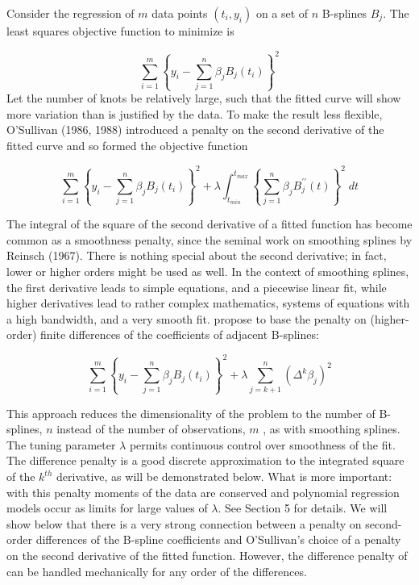 \documentclass[12pt]{article}
\newcommand*\needsparaphrased{\color{red}}
\begin{document}
Consider the regression of $m$ data points $\left(t_i,y_i\right)$ on a set of $n$ B-splines $B_j$. The least squares objective function to minimize is

\begin{equation} \label{eq:univariate_bspline_SSE}
\sum_{i=1}^m \left\{ y_i - \sum_{j=1}^n \beta_j B_j\left(t_i\right) \right\}^2
\end{equation}
\noindent
{ \needsparaphrased Let the number of knots be relatively large, such that the fitted curve will show more variation than is justified by the data. To make the result less flexible, O'Sullivan (1986, 1988) introduced a penalty on the second derivative of the fitted curve and so formed the objective function}

\begin{equation} \label{eq:univariate_bspline_ridge_penalty}
\sum_{i=1}^m \left \{ y_i - \sum_{j=1}^n \beta_j B_j\left(t_i\right) \right \}^2 + \lambda \int_{t_{min}}^{t_{max}} \left\{  \sum_{j=1}^n \beta_j B^{\prime \prime}_j\left(t\right) \right\}^2 \; dt
\end{equation}

{ \needsparaphrased The integral of the square of the second derivative of a fitted function has become common as a smoothness penalty, since the seminal work on smoothing splines by Reinsch (1967). There is nothing special about the second derivative; in fact, lower or higher orders might be used as well. In the context of smoothing splines, the first derivative leads to simple equations, and a piecewise linear fit, while higher derivatives lead to rather complex mathematics, systems of equations with a high bandwidth, and a very smooth fit. \cite{eilers1996flexible} propose to base the penalty on (higher-order) finite differences of the coefficients of adjacent B-splines:}

\begin{equation} \label{eq:univariate_pspline_diff_penalty}
\sum_{i=1}^m \left \{ y_i - \sum_{j=1}^n \beta_j B_j\left(t_i\right) \right \}^2 + \lambda \sum_{j=k+1}^n \left( \Delta^k \beta_j  \right)^2
\end{equation}

This approach reduces the dimensionality of the problem to the number of B-splines, $n$ instead of the number of observations, $m$ , as with smoothing splines. The tuning parameter $\lambda$ permits continuous control over smoothness of the fit. The difference penalty is a good discrete approximation to the integrated square of the $k^{th}$ derivative, as will be demonstrated below. { \needsparaphrased  What is more important: with this penalty moments of the data are conserved and polynomial regression models occur as limits for large values of $\lambda$. See Section 5 for details. We will show below that there is a very strong connection between a penalty on second-order differences of the B-spline coefficients and O'Sullivan's choice of a penalty on the second derivative of the fitted function. However, the difference penalty of \cite{eilers1996flexible} can be handled mechanically for any order of the differences.}
\end{document}
